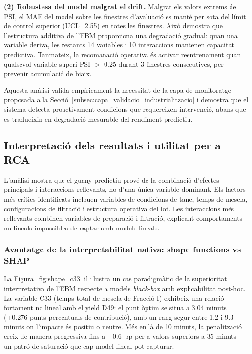 \textbf{(2) Robustesa del model malgrat el drift.} Malgrat els valors extrems de PSI, el MAE del model sobre les finestres d'avaluació es manté per sota del límit de control superior (UCL=2.55) en totes les finestres. Això demostra que l'estructura additiva de l'EBM proporciona una degradació gradual: quan una variable deriva, les restants 14 variables i 10 interaccions mantenen capacitat predictiva. Tanmateix, la recomanació operativa és activar reentrenament quan qualsevol variable superi PSI $>$ 0.25 durant 3 finestres consecutives, per prevenir acumulació de biaix.

Aquesta anàlisi valida empíricament la necessitat de la capa de monitoratge proposada a la Secció~\ref{subsec:capa_validacio_industrialitzacio} i demostra que el sistema detecta proactivament condicions que requereixen intervenció, abans que es tradueixin en degradació mesurable del rendiment predictiu.

\subsection{Interpretació dels resultats i utilitat per a RCA}

L'anàlisi mostra que el guany predictiu prové de la combinació d'efectes principals i interaccions rellevants, no d'una única variable dominant. Els factors més crítics identificats inclouen variables de condicions de tanc, temps de mescla, configuracions de filtració i estructura operativa del lot. Les interaccions més rellevants combinen variables de preparació i filtració, explicant comportaments no lineals impossibles de captar amb models lineals.

\subsubsection{Avantatge de la interpretabilitat nativa: shape functions vs SHAP}

La Figura~\ref{fig:shape_c33} il·lustra un cas paradigmàtic de la superioritat interpretativa de l'EBM respecte a models \emph{black-box} amb explicabilitat post-hoc. La variable C33 (temps total de mescla de Fracció I) exhibeix una relació fortament no lineal amb el yield D49: el punt òptim se situa a 3.04 minuts (+0.276 punts percentuals de contribució), amb un rang segur entre 1.2 i 9.3 minuts on l'impacte és positiu o neutre. Més enllà de 10 minuts, la penalització creix de manera progressiva fins a $-$0.6~pp per a valors superiors a 35 minuts — un patró de saturació que cap model lineal pot capturar.

